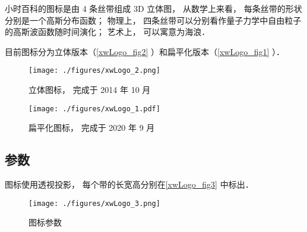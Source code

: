 
\begin{issues}
\issueDraft
{}
\end{issues}

小时百科的图标是由 4 条丝带组成 3D 立体图， 从数学上来看， 每条丝带的形状分别是一个高斯分布函数； 物理上， 四条丝带可以分别看作量子力学中自由粒子的高斯波函数随时间演化； 艺术上， 可以寓意为海浪．

目前图标分为立体版本（\autoref{xwLogo_fig2} ）和扁平化版本（\autoref{xwLogo_fig1} ）．

\begin{figure}[ht]
\centering
\texttt{[image: ./figures/xwLogo\_2.png]}
\caption{立体图标， 完成于 2014 年 10 月} \label{xwLogo_fig2}
\end{figure}

\begin{figure}[ht]
\centering
\texttt{[image: ./figures/xwLogo\_1.pdf]}
\caption{扁平化图标， 完成于 2020 年 9 月} \label{xwLogo_fig1}
\end{figure}

\subsection{参数}
图标使用透视投影， 每个带的长宽高分别在\autoref{xwLogo_fig3} 中标出．
\begin{figure}[ht]
\centering
\texttt{[image: ./figures/xwLogo\_3.png]}
\caption{图标参数} \label{xwLogo_fig3}
\end{figure}
